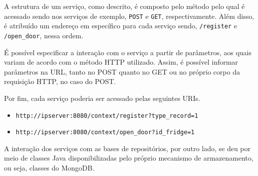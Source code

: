 A estrutura de um serviço, como descrito, é composto pelo método pelo qual é acessado sendo nos serviços de exemplo, \texttt{POST} e \texttt{GET}, respectivamente. Além disso, é atribuído um endereço em específico para cada serviço sendo, \texttt{/register} e \texttt{/open\_door}, nessa ordem. 

É possível especificar a interação com o serviço a partir de parâmetros, aos quais variam de acordo com o método HTTP utilizado. Assim, é possível informar parâmetros na URL, tanto no POST quanto no GET ou no próprio corpo da requisição HTTP, no caso do POST.

Por fim, cada serviço poderia ser acessado pelas seguintes URIs.

\begin{itemize} \parskip -4pt
    \item \texttt{http://ipserver:8080/context/register?type\_record=1}
    \item \texttt{http://ipserver:8080/context/open\_door?id\_fridge=1}
\end{itemize}

A interação dos serviços com as bases de repositórios, por outro lado, se deu por meio de classes Java disponibilizadas pelo próprio mecanismo de armazenamento, ou seja, classes do MongoDB.



